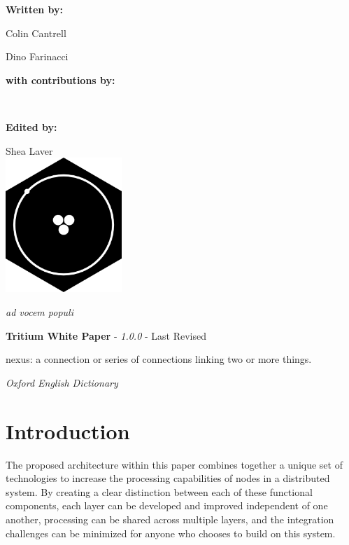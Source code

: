 \documentclass[11pt]{article}
\newcommand{\maketitlepage}[3]{
  \begingroup
  \centering
  
  \vspace*{2\baselineskip}
  
  \textbf{Written by:}\par
  \medskip
  Colin Cantrell\par
  Dino Farinacci\par

  \vspace*{2\baselineskip}

  \textbf{with contributions by:}\par\medskip
  \renewcommand\do[1]{%
    {
    \usevalue ##1:firstname \space \usevalue ##1:lastname \par}%
    }
  \docsvlist{#1}
  \vspace*{2\baselineskip}
  
  \textbf{Edited by:}\par
  \medskip
  Shea Laver
  \\
  \vspace*{3\baselineskip}
  \includegraphics[width=0.33\textwidth]{./rsz_tritium.png}
  \vspace*{1\baselineskip}
  
\begin{center}
\textit{ad vocem populi}
\end{center}  
  \pagebreak
  \endgroup
}
\begin{document}
\title{\rmfamily{}}

\date {\usvardate {}}
\maketitle
\begin{abstract}
\begin{center}
\bigskip
\noindent \textit{``Humanity is the solid foundation of all virtues"}
\end{center}

\begin{flushright}
Confucius
\end{flushright}
\bigskip

\noindent Blockchain is a flourishing technology that is in a constant state of change.
Nexus is pioneering a new approach to Blockchain technology that solves the biggest challenges faced by the industry, \textbf{\textit{viz.}} scalability, ease of integration, and intuitive user experience.
Beginning with the Tritium update, we are creating an innovative software stack containing multiple layers of abstraction that will streamline business integration into the Nexus framework, form the foundation of a cryptographic identity system, and make smart contracts easily accessible through a feature-rich API set.
Each API call will be developed through a standardization process, with input from businesses, industry leaders and developers, focused on providing a well-designed interface and seamless business integration.

\end{abstract}

\newpage

\tableofcontents
\newpage
\maketitlepage{Shea, Jules, Smith, April, Steve}
\newpage


\paragraph{\textbf{Tritium White Paper} - \textit{1.0.0} - Last Revised \date {}  }

\epigraph{nexus: a connection or series of connections linking two or more things.}{\textit{\footnotesize{Oxford English Dictionary}}}
\section{Introduction}

The proposed architecture within this paper combines together a unique set of technologies to increase the processing capabilities of nodes in a distributed system.
By creating a clear distinction between each of these functional components, each layer can be developed and improved independent of one another, processing can be shared across multiple layers, and the integration challenges can be minimized for anyone who chooses to build on this system.
\end{document}
